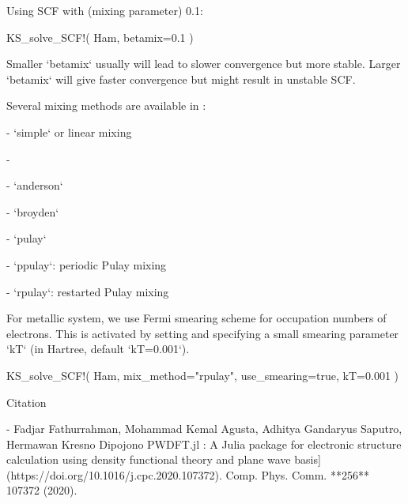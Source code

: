 Using SCF with  (mixing parameter) 0.1:
\begin{juliacode}
KS_solve_SCF!( Ham, betamix=0.1 )
\end{juliacode}

Smaller `betamix` usually will lead to slower convergence but more stable.
Larger `betamix` will give faster convergence but might result in unstable
SCF.

Several mixing methods are available in :

- `simple` or linear mixing

- 

- `anderson`

- `broyden`

- `pulay`

- `ppulay`: periodic Pulay mixing

- `rpulay`: restarted Pulay mixing


For metallic system, we use Fermi smearing scheme for occupation numbers of electrons.
This is activated by setting  and specifying a small smearing parameter `kT`
(in Hartree, default `kT=0.001`).

\begin{juliacode}
KS_solve_SCF!( Ham, mix_method="rpulay", use_smearing=true, kT=0.001 )
\end{juliacode}



Citation

- Fadjar Fathurrahman, Mohammad Kemal Agusta, Adhitya Gandaryus Saputro, Hermawan Kresno Dipojono
  PWDFT.jl : A Julia package for electronic structure calculation using density functional theory and plane wave basis](https://doi.org/10.1016/j.cpc.2020.107372).
  Comp. Phys. Comm. **256** 107372 (2020).

